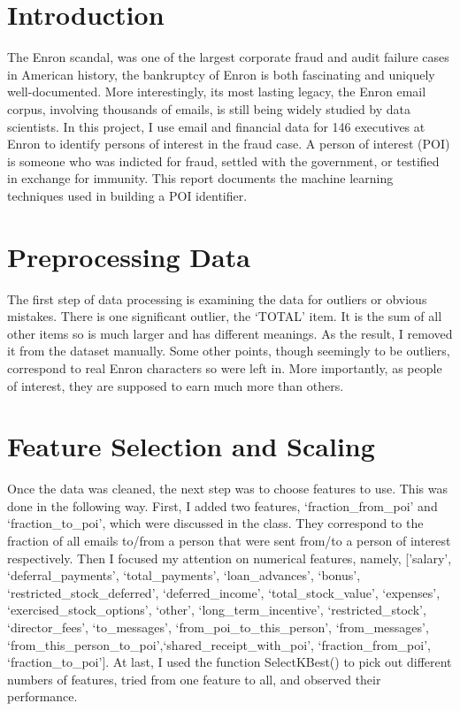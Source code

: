 \documentclass[12pt]{article}
\begin{document}
\maketitle

\section{Introduction}
The Enron scandal, was one of the largest corporate fraud and audit failure cases in American history, the bankruptcy of Enron is both fascinating and uniquely well-documented.  More interestingly, its most lasting legacy, the Enron email corpus, involving thousands of emails, is still being widely studied by data scientists. In this project, I use email and financial data for 146 executives at Enron to identify persons of interest in the fraud case.  A person of interest (POI) is someone who was indicted for fraud, settled with the government, or testified in exchange for immunity.  This report documents the machine learning techniques used in building a POI identifier.
\section{Preprocessing Data}
The first step of data processing is examining the data for outliers or obvious mistakes.  There is one significant outlier, the `TOTAL' item. It is the sum of all other items so is much larger and has different meanings. As the result, I removed it from the dataset manually. Some other points, though seemingly to be outliers, correspond to real Enron characters so were left in.  More importantly, as people of interest, they are supposed to earn much more than others.
\section{Feature Selection and Scaling}
Once the data was cleaned, the next step was to choose features to use.  This was done in the following way. First, I added two features, `fraction\_from\_poi' and `fraction\_to\_poi', which were discussed in the class. They correspond to the fraction of all emails to/from a person that were sent from/to a person of interest respectively. Then I focused my attention on numerical features, namely,
['salary', `deferral\_payments', `total\_payments', `loan\_advances', `bonus', `restricted\_stock\_deferred', `deferred\_income',
`total\_stock\_value', `expenses', `exercised\_stock\_options', `other', `long\_term\_incentive', `restricted\_stock', `director\_fees', `to\_messages', `from\_poi\_to\_this\_person', `from\_messages', `from\_this\_person\_to\_poi',`shared\_receipt\_with\_poi',
`fraction\_from\_poi', `fraction\_to\_poi'].
At last, I used the function SelectKBest() to pick out different numbers of features, tried from one feature to all, and observed their performance.
\end{document}
